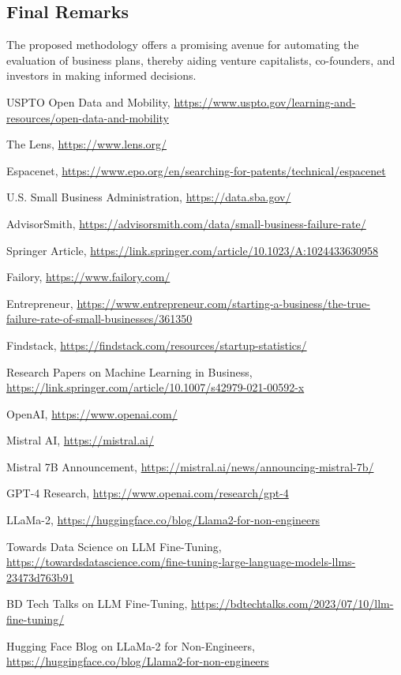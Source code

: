 \documentclass[12pt]{article}
\begin{document}
	\subsection{Final Remarks}
	The proposed methodology offers a promising avenue for automating the evaluation of business plans, thereby aiding venture capitalists, co-founders, and investors in making informed decisions.
		
	
	\begin{thebibliography}{9}
		
		USPTO Open Data and Mobility,
		\url{https://www.uspto.gov/learning-and-resources/open-data-and-mobility}
		
		The Lens,
		\url{https://www.lens.org/}
		
		Espacenet,
		\url{https://www.epo.org/en/searching-for-patents/technical/espacenet}
		
		U.S. Small Business Administration,
		\url{https://data.sba.gov/}
		
		AdvisorSmith,
		\url{https://advisorsmith.com/data/small-business-failure-rate/}
		
		Springer Article,
		\url{https://link.springer.com/article/10.1023/A:1024433630958}
		
		Failory,
		\url{https://www.failory.com/}
		
		Entrepreneur,
		\url{https://www.entrepreneur.com/starting-a-business/the-true-failure-rate-of-small-businesses/361350}
		
		Findstack,
		\url{https://findstack.com/resources/startup-statistics/}
		
		Research Papers on Machine Learning in Business,
		\url{https://link.springer.com/article/10.1007/s42979-021-00592-x}
		
		OpenAI,
		\url{https://www.openai.com/}
		
		Mistral AI,
		\url{https://mistral.ai/}
		
		Mistral 7B Announcement,
		\url{https://mistral.ai/news/announcing-mistral-7b/}
		
		GPT-4 Research,
		\url{https://www.openai.com/research/gpt-4}
		
		LLaMa-2,
		\url{https://huggingface.co/blog/Llama2-for-non-engineers}
		
		Towards Data Science on LLM Fine-Tuning,
		\url{https://towardsdatascience.com/fine-tuning-large-language-models-llms-23473d763b91}
		
		BD Tech Talks on LLM Fine-Tuning,
		\url{https://bdtechtalks.com/2023/07/10/llm-fine-tuning/}
		
		Hugging Face Blog on LLaMa-2 for Non-Engineers,
		\url{https://huggingface.co/blog/Llama2-for-non-engineers}
		
	\end{thebibliography}
	
	
\end{document}
